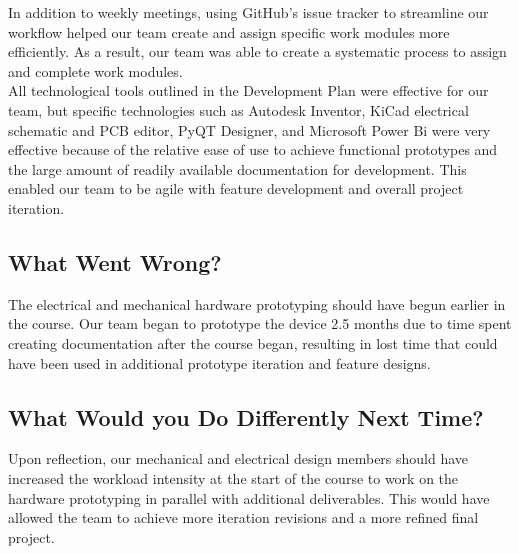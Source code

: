 \documentclass[12pt]{article}
\begin{document}
In addition to weekly meetings, using GitHub's issue tracker to streamline our workflow helped our team create and assign specific work modules more efficiently. As a result, our team was able to create a systematic process to assign and complete work modules. \\

All technological tools outlined in the Development Plan were effective for our team, but specific technologies such as Autodesk Inventor, KiCad electrical schematic and PCB editor, PyQT Designer, and Microsoft Power Bi were very effective because of the relative ease of use to achieve functional prototypes and the large amount of readily available documentation for development. This enabled our team to be agile with feature development and overall project iteration. 

\subsection{What Went Wrong?}


The electrical and mechanical hardware prototyping should have begun earlier in the course. Our team began to prototype the device 2.5 months due to time spent creating documentation after the course began, resulting in lost time that could have been used in additional prototype iteration and feature designs. 

\subsection{What Would you Do Differently Next Time?}


Upon reflection, our mechanical and electrical design members should have increased the workload intensity at the start of the course to work on the hardware prototyping in parallel with additional deliverables. This would have allowed the team to achieve more iteration revisions and a more refined final project. \\
\end{document}
